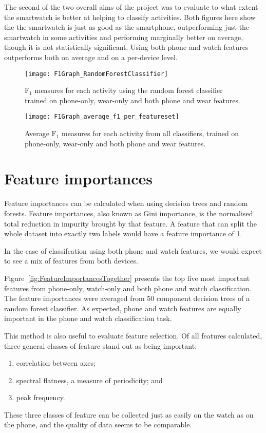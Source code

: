 {{        The second of the two overall aims of the project was to evaluate to what extent the smartwatch is better at helping to classify activities. Both figures here show the the smartwatch is just as good as the smartphone, outperforming just the smartwatch in some activities and performing marginally better on average, though it is not statistically significant. Using both phone and watch features outperforms both on average and on a per-device level.
    \begin{figure}
      \centering
      \texttt{[image: F1Graph\_RandomForestClassifier]}
      \caption{$\mathrm{F}_1$ measures for each activity using the random forest classifier trained on phone-only, wear-only and both phone and wear features.}
      \label{fig:F1Graph_RandomForestClassifier}
    \end{figure}
    \begin{figure}
      \centering
      \texttt{[image: F1Graph\_average\_f1\_per\_featureset]}
      \caption{Average $\mathrm{F}_1$ measures for each activity from all classifiers, trained on phone-only, wear-only and both phone and wear features.}
      \label{fig:F1Graph_average_f1_per_featureset}
    \end{figure}
  
  \section{Feature importances}
    Feature importances can be calculated when using decision trees and random forests. Feature importances, also known as Gini importance, is the normalised total reduction in impurity brought by that feature\cite{breiman2001random}. A feature that can split the whole dataset into exactly two labels would have a feature importance of 1.
    
    In the case of classifcation using both phone and watch features, we would expect to see a mix of features from both devices.
    
    Figure~\ref{fig:FeatureImportancesTogether} presents the top five most important features from phone-only, watch-only and both phone and watch classification. The feature importances were averaged from 50 component decision trees of a random forest classifier. As expected, phone and watch features are equally important in the phone and watch classification task. 
    
    This method is also useful to evaluate feature selection. Of all features calculated, three general classes of feature stand out as being important:
    \begin{enumerate}
      \item correlation between axes;
      \item spectral flatness, a measure of periodicity; and
      \item peak frequency.
    \end{enumerate}
    These three classes of feature can be collected just as easily on the watch as on the phone, and the quality of data seems to be comparable.
    
}}
